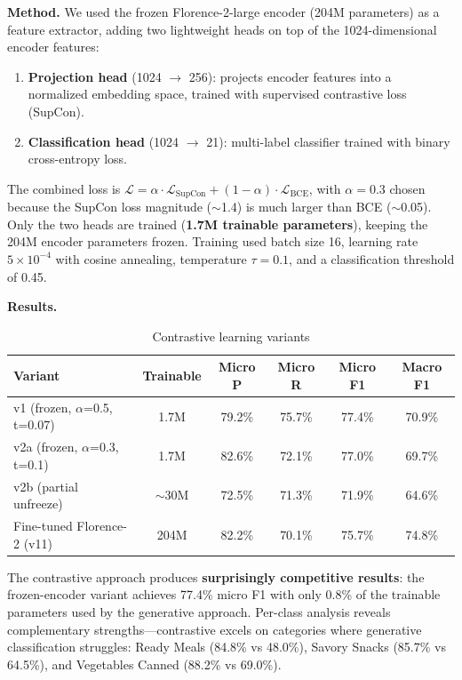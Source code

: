 \textbf{Method.} We used the frozen Florence-2-large encoder (204M parameters) as a feature extractor, adding two lightweight heads on top of the 1024-dimensional encoder features:
\begin{enumerate}[nosep,leftmargin=1.5em]
  \item \textbf{Projection head} (1024 $\rightarrow$ 256): projects encoder features into a normalized embedding space, trained with supervised contrastive loss (SupCon).
  \item \textbf{Classification head} (1024 $\rightarrow$ 21): multi-label classifier trained with binary cross-entropy loss.
\end{enumerate}
The combined loss is $\mathcal{L} = \alpha \cdot \mathcal{L}_{\text{SupCon}} + (1 - \alpha) \cdot \mathcal{L}_{\text{BCE}}$, with $\alpha = 0.3$ chosen because the SupCon loss magnitude ($\sim$1.4) is much larger than BCE ($\sim$0.05). Only the two heads are trained (\textbf{1.7M trainable parameters}), keeping the 204M encoder parameters frozen. Training used batch size 16, learning rate $5 \times 10^{-4}$ with cosine annealing, temperature $\tau = 0.1$, and a classification threshold of 0.45.

\textbf{Results.}

\begin{table}[h]
\centering
\caption{Contrastive learning variants}
\label{tab:contrastive}
\small
\begin{tabular}{lccccc}
\toprule
Variant & Trainable & Micro P & Micro R & Micro F1 & Macro F1 \\
\midrule
v1 (frozen, $\alpha$=0.5, t=0.07) & 1.7M & 79.2\% & 75.7\% & 77.4\% & 70.9\% \\
v2a (frozen, $\alpha$=0.3, t=0.1) & 1.7M & 82.6\% & 72.1\% & 77.0\% & 69.7\% \\
v2b (partial unfreeze) & $\sim$30M & 72.5\% & 71.3\% & 71.9\% & 64.6\% \\
\midrule
Fine-tuned Florence-2 (v11) & 204M & 82.2\% & 70.1\% & 75.7\% & 74.8\% \\
\bottomrule
\end{tabular}
\end{table}

The contrastive approach produces \textbf{surprisingly competitive results}: the frozen-encoder variant achieves 77.4\% micro F1 with only 0.8\% of the trainable parameters used by the generative approach. Per-class analysis reveals complementary strengths—contrastive excels on categories where generative classification struggles: Ready Meals (84.8\% vs 48.0\%), Savory Snacks (85.7\% vs 64.5\%), and Vegetables Canned (88.2\% vs 69.0\%).

